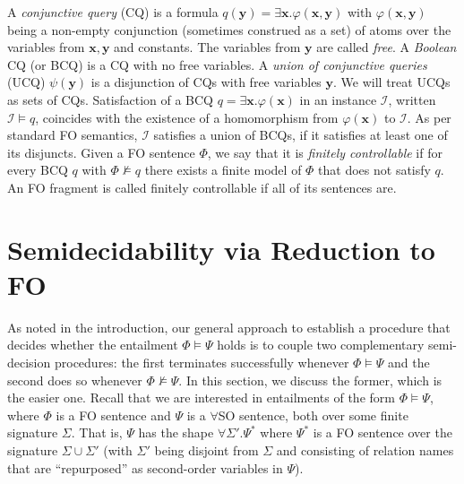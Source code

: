 \documentclass[10pt,a4paper]{amsart}
\theoremstyle{definition}
\numberwithin{equation}{section}
\theoremstyle{plain}
\theoremstyle{definition}
\newtheorem{definition}[definition]{Definition}
\theoremstyle{myexample}
\theoremstyle{plain}
\theoremstyle{definition}
\renewcommand{\vec}[1]{\boldsymbol{#1}}
\newcommand{\instance}{\mathcal{I}}
\newcommand{\vx}{\vec{x}}
\newcommand{\vy}{\vec{y}}
\newcommand{\query}{q}
\renewcommand{\phi}{\varphi}
\begin{document}
\medskip {}
A {\em conjunctive query} (CQ) %
 is a  formula $\query(\vy) = \exists \vx .\phi(\vx, \vy)$ with $\phi(\vx, \vy)$ being a non-empty conjunction (sometimes construed as a set) of atoms over the variables from $\vx,\vy$ and constants.
 The variables from $\vy$ are called {\em free}. A \emph{Boolean} CQ (or BCQ) is a CQ with no free variables.
 A \emph{union of conjunctive queries} (UCQ) $\psi(\vy)$ is a disjunction of CQs with free variables $\vy$. 
 We will treat UCQs as sets of CQs. %
%
Satisfaction of a BCQ $\query = \exists \vx .\phi(\vx)$ in an instance $\instance$, written $\instance \models q$, coincides with the existence of a homomorphism from $\phi(\vx)$ to $\instance$. As per standard FO semantics, $\instance$ satisfies a union of BCQs, if it satisfies at least one of its disjuncts.
%
Given a FO sentence $\Phi$, we say that it is \emph{finitely controllable} if for every BCQ $q$ with $\Phi \not\models q$ there exists a finite model of $\Phi$ that does not satisfy $q$.
An FO fragment is called finitely controllable if all of its sentences are. 

\section{Semidecidability via Reduction to FO}\label{sec:easy}

As noted in the introduction, our general approach to establish a procedure that decides whether the entailment $\Phi \models \Psi$ holds is to couple two complementary semi-decision procedures: the first terminates successfully whenever $\Phi \models \Psi$ and the second does so whenever $\Phi \not\models \Psi$. In this section, we discuss the former, which is the easier one. Recall that we are interested in entailments of the form $\Phi \models \Psi$, where $\Phi$ is a FO sentence and $\Psi$ is a $\forall$SO sentence, both over some finite signature $\Sigma$. That is, $\Psi$ has the shape $\forall\Sigma'.\Psi^*$ where $\Psi^*$ is a FO sentence over the signature $\Sigma\cup\Sigma'$ 
(with $\Sigma'$ being disjoint from $\Sigma$ and consisting of relation names that are ``repurposed'' as second-order variables in $\Psi$).  
\end{document}
